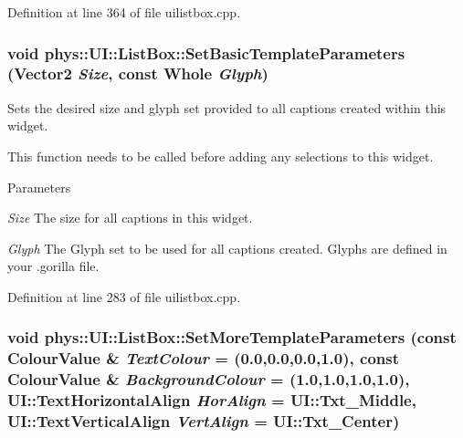 Definition at line 364 of file uilistbox.cpp.

\hypertarget{classphys_1_1UI_1_1ListBox_a093415bd4d69dfdb0b1ffa3f868fe4f5}{
\subsubsection[{SetBasicTemplateParameters}]{\setlength{\rightskip}{0pt plus 5cm}void phys::UI::ListBox::SetBasicTemplateParameters ({\bf Vector2} {\em Size}, \/  const {\bf Whole} {\em Glyph})}}
\label{d0/d28/classphys_1_1UI_1_1ListBox_a093415bd4d69dfdb0b1ffa3f868fe4f5}


Sets the desired size and glyph set provided to all captions created within this widget. 

This function needs to be called before adding any selections to this widget. 
\begin{DoxyParams}{Parameters}
\item[{\em Size}]The size for all captions in this widget. \item[{\em Glyph}]The Glyph set to be used for all captions created. Glyphs are defined in your .gorilla file. \end{DoxyParams}


Definition at line 283 of file uilistbox.cpp.

\hypertarget{classphys_1_1UI_1_1ListBox_a8396c55be0de8fd33d8ce35b83781540}{
\subsubsection[{SetMoreTemplateParameters}]{\setlength{\rightskip}{0pt plus 5cm}void phys::UI::ListBox::SetMoreTemplateParameters (const {\bf ColourValue} \& {\em TextColour} = {(0.0,0.0,0.0,1.0)}, \/  const {\bf ColourValue} \& {\em BackgroundColour} = {(1.0,1.0,1.0,1.0)}, \/  UI::TextHorizontalAlign {\em HorAlign} = {\ttfamily UI::Txt\_\-Middle}, \/  UI::TextVerticalAlign {\em VertAlign} = {\ttfamily UI::Txt\_\-Center})}}
\label{d0/d28/classphys_1_1UI_1_1ListBox_a8396c55be0de8fd33d8ce35b83781540}


